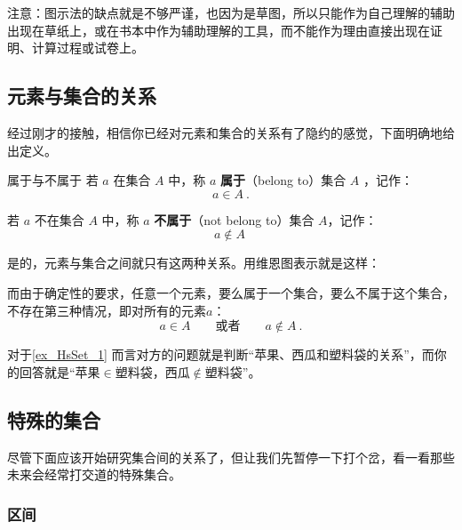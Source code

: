注意：图示法的缺点就是不够严谨，也因为是草图，所以只能作为自己理解的辅助出现在草纸上，或在书本中作为辅助理解的工具，而不能作为理由直接出现在证明、计算过程或试卷上。

\subsection{元素与集合的关系}

经过刚才的接触，相信你已经对元素和集合的关系有了隐约的感觉，下面明确地给出定义。

\begin{definition}{属于与不属于}
若 $a$ 在集合 $A$ 中，称 $a$ \textbf{属于}（belong to）集合 $A$ ，记作：
\begin{equation}
a \in A~.
\end{equation}

若 $a$ 不在集合 $A$ 中，称 $a$ \textbf{不属于}（not belong to）集合 $A$，记作：
\begin{equation}
a\notin A~
\end{equation}
\end{definition}
是的，元素与集合之间就只有这两种关系。用维恩图表示就是这样：

而由于确定性的要求，任意一个元素，要么属于一个集合，要么不属于这个集合，不存在第三种情况，即对所有的元素$a$：
\begin{equation}
a\in A\qquad\text{或者}\qquad a\not\in A~.
\end{equation}

对于\autoref{ex_HsSet_1} 而言对方的问题就是判断“苹果、西瓜和塑料袋的关系”，而你的回答就是“苹果$\in$塑料袋，西瓜$\notin$塑料袋”。

\subsection{特殊的集合}\label{sub_HsSet_2}

尽管下面应该开始研究集合间的关系了，但让我们先暂停一下打个岔，看一看那些未来会经常打交道的特殊集合。

\subsubsection{区间}

